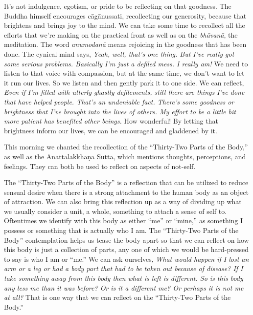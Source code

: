It's not indulgence, egotism, or pride to be reflecting on that 
goodness. The Buddha himself encourages cāgānussati, recollecting our 
generosity, because that brightens and brings joy to the mind. We can 
take some time to recollect all the efforts that we're making on the 
practical front as well as on the \emph{bhāvanā}, the meditation. The 
word \emph{anumodanā} means rejoicing in the goodness that has been 
done. The cynical mind says, \emph{Yeah, well, that's one thing. But 
I've really got some serious problems. Basically I'm just a defiled 
mess. I really am!} We need to listen to that voice with compassion, 
but at the same time, we don't want to let it run our lives. So we 
listen and then gently park it to one side. We can reflect, \emph{Even 
if I'm filled with utterly ghastly defilements, still there are things 
I've done that have helped people. That's an undeniable fact. There's 
some goodness or brightness that I've brought into the lives of others. 
My effort to be a little bit more patient has benefited other beings.} 
How wonderful! By letting that brightness inform our lives, we can be 
encouraged and gladdened by it.


This morning we chanted the recollection of the ``Thirty-Two Parts of 
the Body,'' as well as the Anattalakkhaṇa Sutta, which mentions 
thoughts, perceptions, and feelings. They can both be used to reflect 
on aspects of not-self.

The ``Thirty-Two Parts of the Body'' is a reflection that can be 
utilized to reduce sensual desire when there is a strong attachment to 
the human body as an object of attraction. We can also bring this 
reflection up as a way of dividing up what we usually consider a unit, 
a whole, something to attach a sense of self to. Oftentimes we identify 
with this body as either ``me'' or ``mine,'' as something I possess or 
something that is actually who I am. The ``Thirty-Two Parts of the 
Body'' contemplation helps us tease the body apart so that we can 
reflect on how this body is just a collection of parts, any one of 
which we would be hard-pressed to say is who I am or ``me.'' We can ask 
ourselves, \emph{What would happen if I lost an arm or a leg or had a 
body part that had to be taken out because of disease? If I take 
something away from this body then what is left is different. So is 
this body any less me than it was before? Or is it a different me? Or 
perhaps it is not me at all?} That is one way that we can reflect on 
the ``Thirty-Two Parts of the Body.''

